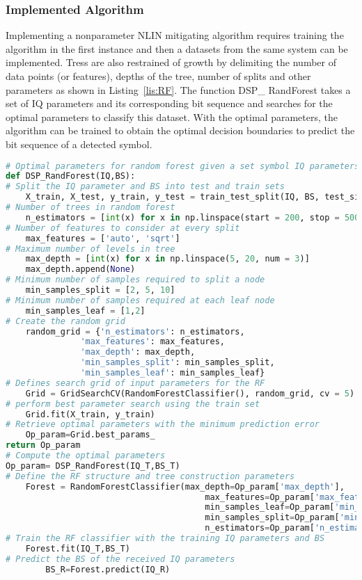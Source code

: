 \subsubsection{Implemented Algorithm}
Implementing a nonparameter NLIN mitigating algorithm requires training the algorithm in the first instance and then a datasets from the same system can be implemented. Tress are also restrained of growth by delimiting the number of data points (or features), depths of the tree, number of splits and other parameters as shown in Listing~\ref{lis:RF}. The function DSP\_ RandForest takes a set of IQ parameters and its corresponding bit sequence and searches for the optimal parameters to classify this dataset. With the optimal parameters, the algorithm can be trained to obtain the optimal decision boundaries to predict the bit sequence of a detected symbol.    


\begin{lstlisting}[language=Python,caption=Random forest implementation in python where the optimal parameter are determined form a training dataset. With the optimal parameters the scheme can classify a new set of IQ parameters and determine the decode bit sequence.,label=lis:RF]
# Optimal parameters for random forest given a set symbol IQ parameters and the decoded bit sequence BS
def DSP_RandForest(IQ,BS):
# Split the IQ parameter and BS into test and train sets
	X_train, X_test, y_train, y_test = train_test_split(IQ, BS, test_size = 0.2)
# Number of trees in random forest
	n_estimators = [int(x) for x in np.linspace(start = 200, stop = 500, num = 3)]
# Number of features to consider at every split
	max_features = ['auto', 'sqrt']
# Maximum number of levels in tree
	max_depth = [int(x) for x in np.linspace(5, 20, num = 3)]
	max_depth.append(None)
# Minimum number of samples required to split a node
	min_samples_split = [2, 5, 10]
# Minimum number of samples required at each leaf node
	min_samples_leaf = [1,2]
# Create the random grid
	random_grid = {'n_estimators': n_estimators,
               'max_features': max_features,
               'max_depth': max_depth,
               'min_samples_split': min_samples_split,
               'min_samples_leaf': min_samples_leaf}
# Defines search grid of input parameters for the RF 
    Grid = GridSearchCV(RandomForestClassifier(), random_grid, cv = 5)
# perform best parameter search using the train set
    Grid.fit(X_train, y_train)
# Retrieve optimal parameters with the minimum prediction error 
    Op_param=Grid.best_params_
return Op_param
# Compute the optimal parameters
Op_param= DSP_RandForest(IQ_T,BS_T)
# Define the RF structure and tree construction parameters  
	Forest = RandomForestClassifier(max_depth=Op_param['max_depth'],
										max_features=Op_param['max_features'],
										min_samples_leaf=Op_param['min_samples_leaf'],
										min_samples_split=Op_param['min_samples_split'],
										n_estimators=Op_param['n_estimators'])
# Train the RF classifier with the training IQ parameters and BS       
    Forest.fit(IQ_T,BS_T)
# Predict the BS of the received IQ parameters 
    	BS_R=Forest.predict(IQ_R)
\end{lstlisting}



